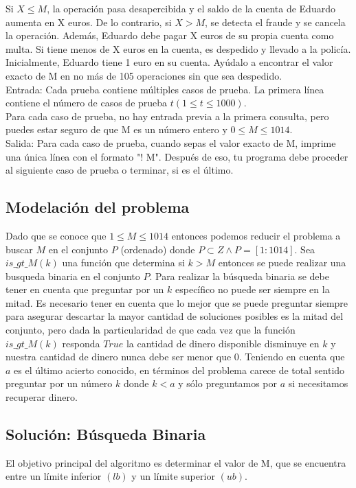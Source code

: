 \documentclass[
10pt, %
a4paper, %
oneside, %
headinclude,footinclude, %
BCOR5mm, %
]{scrartcl}
\begin{document}
Si $X \leq M$, la operación pasa desapercibida y el saldo de la cuenta de Eduardo aumenta en X euros.  
De lo contrario, si $X > M$, se detecta el fraude y se cancela la operación. Además, Eduardo debe pagar X euros de su propia cuenta como multa. Si tiene menos de X euros en la cuenta, es despedido y llevado a la policía.  
Inicialmente, Eduardo tiene 1 euro en su cuenta. Ayúdalo a encontrar el valor exacto de M en no más de 105 operaciones sin que sea despedido.\\

Entrada:
Cada prueba contiene múltiples casos de prueba. La primera línea contiene el número de casos de prueba $t (1 \leq t \leq 1000)$.\\

Para cada caso de prueba, no hay entrada previa a la primera consulta, pero puedes estar seguro de que M es un número entero y $0 \leq M \leq 1014$.\\

Salida:
Para cada caso de prueba, cuando sepas el valor exacto de M, imprime una única línea con el formato "! M". Después de eso, tu programa debe proceder al siguiente caso de prueba o terminar, si es el último.\\


\subsection{Modelación del problema}

Dado que se conoce que $1 \leq M \leq 1014$ entonces podemos reducir el problema a buscar $M$ en el conjunto $P$ (ordenado) donde $P \subset Z \wedge P = [1:1014]$. Sea $is\_ gt\_ M(k)$ una función que determina si $k > M$ entonces se puede realizar una busqueda binaria en el conjunto $P$.
Para realizar la búsqueda binaria se debe tener en cuenta que preguntar por un $k$ específico no puede ser siempre en la mitad. Es necesario tener en cuenta que lo mejor que se puede preguntar siempre para asegurar descartar la mayor cantidad de soluciones posibles es la mitad del conjunto,
pero dada la particularidad de que cada vez que la función $is\_ gt\_ M(k)$ responda $True$ la cantidad de dinero disponible disminuye en $k$ y nuestra cantidad de dinero nunca debe  ser menor que $0$.
Teniendo en cuenta que $a$ es el último acierto conocido, en términos del problema carece de total sentido preguntar por un número $k$ donde $k<a$ y sólo preguntamos por $a$ si necesitamos recuperar dinero. 

\subsection{Solución: Búsqueda Binaria}
El objetivo principal del algoritmo es determinar el valor de M, que se encuentra entre un límite inferior $(lb)$ y un límite superior $(ub)$. 
\end{document}
